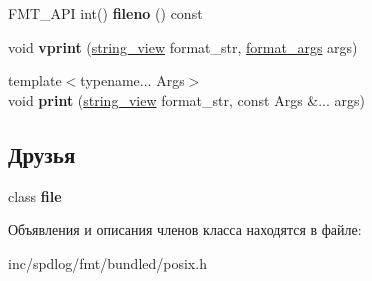 \begin{DoxyCompactItemize}
\item 
\mbox{\label{classbuffered__file_ab86229c986f9598cf523ce2a026b750c}} 
F\+M\+T\+\_\+\+A\+PI int() {\bfseries fileno} () const
\item 
\mbox{\label{classbuffered__file_a0a34fceffc31cc126a6b731461c88d8d}} 
void {\bfseries vprint} (\hyperlink{classbasic__string__view}{string\+\_\+view} format\+\_\+str, \hyperlink{structformat__args}{format\+\_\+args} args)
\item 
\mbox{\label{classbuffered__file_ad97c4521f94be51a5b30064803e2bef1}} 
{\footnotesize template$<$typename... Args$>$ }\\void {\bfseries print} (\hyperlink{classbasic__string__view}{string\+\_\+view} format\+\_\+str, const Args \&... args)
\end{DoxyCompactItemize}
\subsection*{Друзья}
\begin{DoxyCompactItemize}
\item 
\mbox{\label{classbuffered__file_a686a90482e62dd1618201a3c79f9aae6}} 
class {\bfseries file}
\end{DoxyCompactItemize}


Объявления и описания членов класса находятся в файле\+:\begin{DoxyCompactItemize}
\item 
inc/spdlog/fmt/bundled/posix.\+h\end{DoxyCompactItemize}

